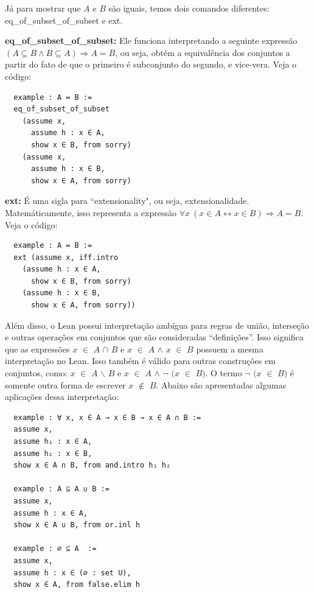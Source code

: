   Já para mostrar que $A$ e $B$ são iguais, temos dois comandos diferentes: {\selectfont eq\_of\_subset\_of\_subset} e {\selectfont ext}.

  \textbf{eq\_of\_subset\_of\_subset:} Ele funciona interpretando a seguinte expressão $(A \subseteq B \wedge B \subseteq A) \Rightarrow A=B$, ou seja, obtém a equivalência dos conjuntos a partir do fato de que o primeiro é subconjunto do segundo, e vice-vera. Veja o código:

  \begin{lstlisting}
  example : A = B :=
  eq_of_subset_of_subset
    (assume x,
      assume h : x ∈ A,
      show x ∈ B, from sorry)
    (assume x,
      assume h : x ∈ B,
      show x ∈ A, from sorry) \end{lstlisting}

  \textbf{ext:} É uma sigla para ``extensionality", ou seja, extensionalidade. Matemáticamente, isso representa a expressão $\forall x \ (x \in A \leftrightarrow x \in B) \Rightarrow A=B$. Veja o código:

  \begin{lstlisting}
  example : A = B :=
  ext (assume x, iff.intro
    (assume h : x ∈ A,
      show x ∈ B, from sorry)
    (assume h : x ∈ B,
      show x ∈ A, from sorry)) \end{lstlisting}

  Além disso, o Lean possui interpretação ambígua para regras de união, interseção e outras operações em conjuntos que são consideradas “definições”. Isso significa que as expressões $x$ $\in$ $A$ $\cap$ $B$ e $x$ $\in$ $A$ $\wedge$ $x$ $\in$ $B$ possuem a mesma interpretação no Lean. Isso também é válido para outras construções em conjuntos, como: $x$ $\in$ $A$ $\backslash $ $B$ e $x$ $\in$ $A$ $\wedge$ $\neg$ $(x$ $\in$ $B)$. O termo $\neg$ $(x$ $\in$ $B)$ é somente outra forma de escrever $x$ $\notin$ $B$. Abaixo são apresentadas algumas aplicações dessa interpretação:

  \begin{lstlisting}
  example : ∀ x, x ∈ A → x ∈ B → x ∈ A ∩ B :=
  assume x,
  assume h₁ : x ∈ A,
  assume h₂ : x ∈ B,
  show x ∈ A ∩ B, from and.intro h₁ h₂

  example : A ⊆ A ∪ B :=
  assume x,
  assume h : x ∈ A,
  show x ∈ A ∪ B, from or.inl h

  example : ∅ ⊆ A  :=
  assume x,
  assume h : x ∈ (∅ : set U),
  show x ∈ A, from false.elim h \end{lstlisting}


